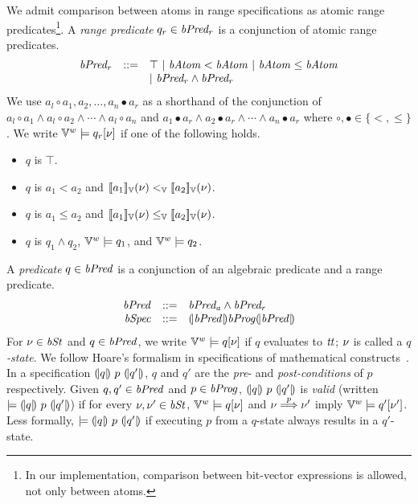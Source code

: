 We admit comparison between atoms in range specifications as atomic range predicates\footnote{In our implementation, comparison between bit-vector expressions is allowed, not only between atoms.}.
A \emph{range predicate} $q_r \in \mathit{bPred_r}$ is a conjunction of atomic range predicates.
\[
\begin{array}{rcl}
  \mathit{bPred_r} & ::= & \top \ |\ \mathit{bAtom} < \mathit{bAtom} \ |\ \mathit{bAtom} \leq \mathit{bAtom} \\
           &     & |\ \mathit{bPred_r} \wedge \mathit{bPred_r} \\
\end{array}
\]
We use $a_l \circ a_1, a_2, \ldots, a_n \bullet a_r$ as a shorthand of the conjunction of $a_l \circ a_1 \wedge a_l \circ a_2 \wedge \cdots \wedge a_l \circ a_n$ and $a_1 \bullet a_r \wedge a_2 \bullet a_r \wedge \cdots \wedge a_n \bullet a_r$ where $\circ, \bullet \in \{<, \leq\}$.
We write $\mathbb{V}^w \models q_r[\nu]$ if one of the following holds.
\begin{itemize}
  \item $q$ is $\top$.
  \item $q$ is $a_1 < a_2$ and $[\![{a_1}]\!]_{\mathbb{V}}(\nu) <_{\mathbb{V}} [\![{a_2}]\!]_{\mathbb{V}}(\nu)$.
  \item $q$ is $a_1 \leq a_2$ and $[\![{a_1}]\!]_{\mathbb{V}}(\nu) \leq_{\mathbb{V}} [\![{a_2}]\!]_{\mathbb{V}}(\nu)$.
  \item $q$ is $q_1 \wedge q_2$, $\mathbb{V}^w \models q_1$, and $\mathbb{V}^w \models q_2$.
\end{itemize}

A \emph{predicate} $q \in \mathit{bPred}$ is a conjunction of an algebraic predicate and a range predicate.
\[
\begin{array}{rcl}
  \mathit{bPred} & ::= & \mathit{bPred_a} \wedge \mathit{bPred_r} \\
  \mathit{bSpec} & ::= & {(\!|}{\mathit{bPred}}{|\!)} \mathit{bProg} {(\!|}{\mathit{bPred}}{|\!)}
\end{array}
\]
For $\nu \in \mathit{bSt}$ and $q \in \mathit{bPred}$, we write $\mathbb{V}^w \models q[\nu]$ if $q$ evaluates to $\mathit{tt}$; $\nu$ is called a \emph{$q$-state}.
We follow Hoare's formalism in specifications of mathematical constructs~\cite{H:69:ABCP}.
In a specification ${(\!|}{q}{|\!)}~{p}~{(\!|}{q'}{|\!)}$, $q$ and $q'$ are the \emph{pre}- and \emph{post-conditions} of $p$ respectively.
Given $q, q' \in \mathit{bPred}$ and $p \in \mathit{bProg}$, ${(\!|}{q}{|\!)}~{p}~{(\!|}{q'}{|\!)}$ is \emph{valid} (written $\models {(\!|}{q}{|\!)}~{p}~{(\!|}{q'}{|\!)}$) if for every $\nu, \nu' \in \mathit{bSt}$, $\mathbb{V}^w \models q[\nu]$ and $\nu \overset{p}{\Longrightarrow} \nu'$ imply $\mathbb{V}^w \models q'[\nu']$.
Less formally, $\models {(\!|}{q}{|\!)}~{p}~{(\!|}{q'}{|\!)}$ if executing $p$ from a $q$-state always results in a $q'$-state.

